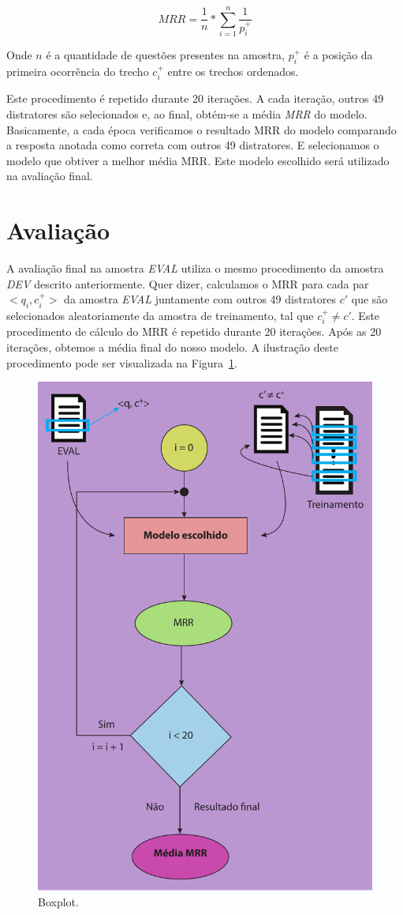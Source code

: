 \begin{equation}
MRR = \frac{1}{n} * \sum_{i = 1}^{n}\frac{1}{p_{i}^{+}}    
\end{equation}

Onde $n$ é a quantidade de questões presentes na amostra, $p_{i}^{+}$ é a posição da primeira ocorrência do trecho $c_{i}^{+}$ entre os trechos ordenados. 

Este procedimento é repetido durante 20 iterações. A cada iteração, outros 49 distratores são selecionados e, ao final, obtém-se a média \emph{MRR} do modelo. Basicamente, a cada época verificamos o resultado MRR do modelo comparando a resposta anotada como correta com outros 49 distratores. E selecionamos o modelo que obtiver a melhor média MRR. Este modelo escolhido será utilizado na avaliação final.

\section{Avaliação}
\label{sec:avaliacao}

A avaliação final na amostra \emph{EVAL} utiliza o mesmo procedimento da amostra \emph{DEV} descrito anteriormente. Quer dizer, calculamos o MRR para cada par $<q_{i}, c_{i}^{+}>$ da amostra \emph{EVAL} juntamente com outros 49 distratores $c'$ que são selecionados aleatoriamente da amostra de treinamento, tal que $c_{i}^{+} \neq c'$. Este procedimento de cálculo do MRR é repetido durante 20 iterações. Após as 20 iterações, obtemos a média final do nosso modelo. A ilustração deste procedimento pode ser visualizada na Figura~\ref{fig:final-evaluation-process}.

\begin{figure}[h]
\centering
\includegraphics[height=1\textwidth]{figuras/cap-experimento/final_evaluation_process.pdf}
\caption{Boxplot.}
\label{fig:final-evaluation-process}
\end{figure}

